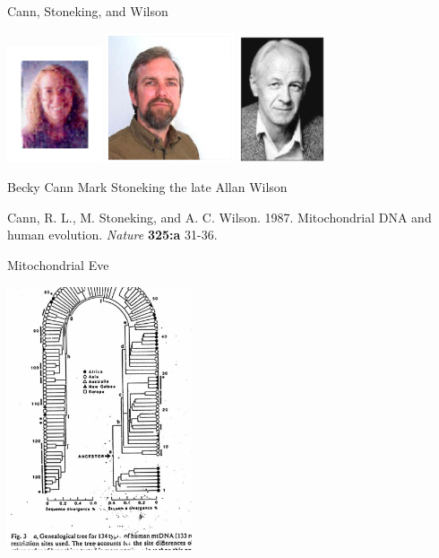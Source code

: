 \documentclass[bluish,slideColor,colorBG,pdf]{prosper}
\begin{document}
\begin{slide}[Replace]{Cann, Stoneking, and Wilson}

\centerline{
\includegraphics[width=1.10in]{rebecca-cann.ps}
\hfill
\includegraphics[width=1.5in]{stoneking.ps}
\hfill
\includegraphics[width=1.0in]{AllanWilson.ps}
}

Becky Cann \hfill Mark Stoneking \hfill the late Allan Wilson \\
\bigskip

\noindent
Cann, R. L., M. Stoneking, and A. C. Wilson. 1987. Mitochondrial DNA and human
evolution. {\it Nature} {\bf 325:a} 31-36.

\end{slide}

\begin{slide}[Replace]{Mitochondrial Eve}

\centerline{\includegraphics[width=2.15in]{mteve.ps}}

\end{slide}
\end{document}
